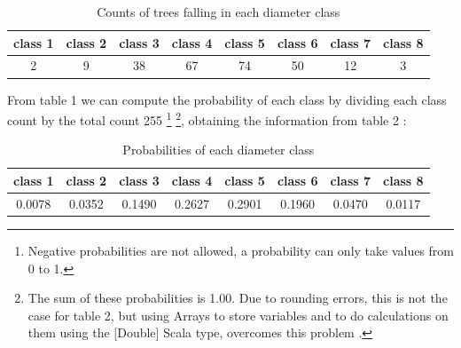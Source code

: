 \documentclass {article}
\begin{document}
\begin{table} [h!]
\centering
\caption{Counts of trees falling in each diameter class}
\label{tab: table1}
\begin{tabular}{cccccccc}
\toprule

class 1 & class 2 & class 3 & class 4 & class 5 & class 6 & class 7 & class 8 \\

\midrule

2 & 9 & 38 & 67 & 74 & 50 & 12 & 3\\

\bottomrule
\end{tabular}
\end{table} 
From table 1 we can compute the probability of each class by dividing each class count by the total count 255
\footnote{Negative probabilities are not allowed, a probability can only take values from 0 to 1.} 
\footnote{The sum of these probabilities is 1.00. Due to rounding errors, this is not the case for table 2, but using Arrays to store variables and to do calculations on them using the [Double] Scala type, overcomes this problem \cite{lewis_introduction_2017}.},
 obtaining the information from table 2 \cite{lial_calculus_2012}:
\begin{table} [h!]
\centering
\caption{Probabilities of each diameter class}
\label{tab: table2}
\begin{tabular}{cccccccc}
\toprule
   
class 1 & class 2 & class 3 & class 4 & class 5 & class 6 & class 7 & class 8 \\

\midrule

0.0078 & 0.0352 & 0.1490 & 0.2627 & 0.2901 & 0.1960 & 0.0470 & 0.0117 \\

\bottomrule
\end{tabular}
\end{table}
\end{document}
